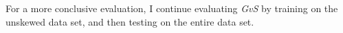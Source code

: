 For a more conclusive evaluation, I continue evaluating {\it GvS} by training on the unskewed data set, and then testing on the entire data set.
%
%
%
%
